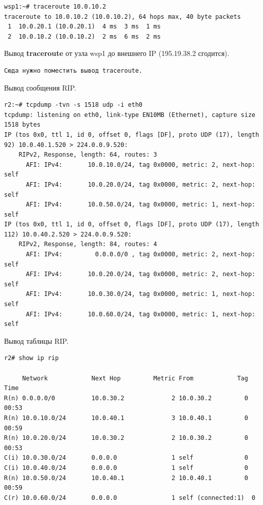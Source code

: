 \documentclass[a4paper,12pt]{article}
\begin{document}
\begin{Verbatim}
wsp1:~# traceroute 10.0.10.2
traceroute to 10.0.10.2 (10.0.10.2), 64 hops max, 40 byte packets
 1  10.0.20.1 (10.0.20.1)  4 ms  3 ms  1 ms
 2  10.0.10.2 (10.0.10.2)  2 ms  6 ms  2 ms
\end{Verbatim}

Вывод \textbf{traceroute} от узла wsp1 до внешнего IP (195.19.38.2 сгодится).

\begin{Verbatim}
Сюда нужно поместить вывод traceroute.
\end{Verbatim}

Вывод сообщения RIP.

\begin{Verbatim}
r2:~# tcpdump -tvn -s 1518 udp -i eth0
tcpdump: listening on eth0, link-type EN10MB (Ethernet), capture size 1518 bytes
IP (tos 0x0, ttl 1, id 0, offset 0, flags [DF], proto UDP (17), length 92) 10.0.40.1.520 > 224.0.0.9.520: 
	RIPv2, Response, length: 64, routes: 3
	  AFI: IPv4:       10.0.10.0/24, tag 0x0000, metric: 2, next-hop: self
	  AFI: IPv4:       10.0.20.0/24, tag 0x0000, metric: 2, next-hop: self
	  AFI: IPv4:       10.0.50.0/24, tag 0x0000, metric: 1, next-hop: self
IP (tos 0x0, ttl 1, id 0, offset 0, flags [DF], proto UDP (17), length 112) 10.0.40.2.520 > 224.0.0.9.520: 
	RIPv2, Response, length: 84, routes: 4
	  AFI: IPv4:         0.0.0.0/0 , tag 0x0000, metric: 2, next-hop: self
	  AFI: IPv4:       10.0.20.0/24, tag 0x0000, metric: 2, next-hop: self
	  AFI: IPv4:       10.0.30.0/24, tag 0x0000, metric: 1, next-hop: self
	  AFI: IPv4:       10.0.60.0/24, tag 0x0000, metric: 1, next-hop: self
\end{Verbatim}

Вывод таблицы RIP.

\begin{Verbatim}
r2# show ip rip

     Network            Next Hop         Metric From            Tag Time
R(n) 0.0.0.0/0          10.0.30.2             2 10.0.30.2         0 00:53
R(n) 10.0.10.0/24       10.0.40.1             3 10.0.40.1         0 00:59
R(n) 10.0.20.0/24       10.0.30.2             2 10.0.30.2         0 00:53
C(i) 10.0.30.0/24       0.0.0.0               1 self              0
C(i) 10.0.40.0/24       0.0.0.0               1 self              0
R(n) 10.0.50.0/24       10.0.40.1             2 10.0.40.1         0 00:59
C(r) 10.0.60.0/24       0.0.0.0               1 self (connected:1)  0
\end{Verbatim}
\end{document}
